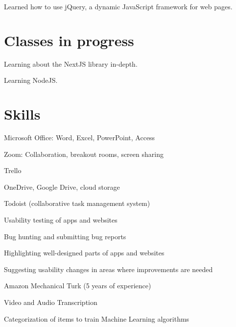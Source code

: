 \documentclass[]{deedy-resume-openfont}
\begin{document}
Learned how to use jQuery, a dynamic JavaScript framework for web pages.
\sectionsep

\section{Classes in progress}
Learning about the NextJS library in-depth.
\sectionsep

Learning NodeJS.
\sectionsep

\section{Skills}
\descript{}
\begin{tightemize}
\item Microsoft Office: Word\footnotemark, Excel\footnotemark[\value{footnote}], PowerPoint, Access
\item Zoom: Collaboration, breakout rooms, screen sharing
\item Trello
\item OneDrive, Google Drive, cloud storage
\item Todoist (collaborative task management system)
\end{tightemize}
\sectionsep

\descript{}
\begin{tightemize}
\item Usability testing of apps and websites
\item Bug hunting and submitting bug reports
\item Highlighting well-designed parts of apps and websites
\item Suggesting usability changes in areas where improvements are needed
\end{tightemize}
\sectionsep

\descript{}
\begin{tightemize}
\item Amazon Mechanical Turk (5 years of experience)
\item Video and Audio Transcription
\item Categorization of items to train Machine Learning algorithms
\end{tightemize}
\sectionsep
\end{document}
